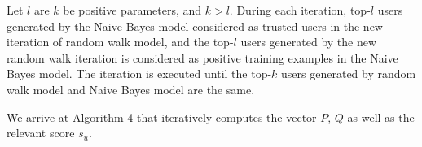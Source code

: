 \documentclass{article}
\begin{document}
Let $l$ are $k$ be positive parameters, and $k > l$. During each iteration, top-$l$ users generated by the Naive Bayes model considered as trusted users in the new iteration of random walk model, and the top-$l$ users generated by the new random walk iteration is considered as positive training examples in the Naive Bayes model. The iteration is executed until the top-$k$ users generated by random walk model and Naive Bayes model are the same.

We arrive at Algorithm 4 that iteratively computes the vector $P$, $Q$ as well as the relevant score $s_u$.

\ifx \allfiles \undefined
\end{document}
